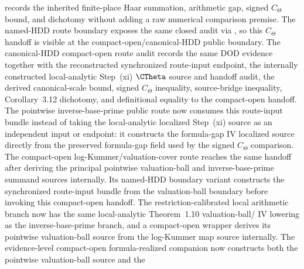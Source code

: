 \begin{proposition}
  records the inherited finite-place Haar summation, arithmetic gap,
  signed \(C_\Theta\) bound, and dichotomy without adding a raw numerical
  comparison premise.  The named-HDD route boundary exposes the same closed
  audit via
  ,
  so this \(C_\Theta\) handoff is visible at the compact-open/canonical-HDD
  public boundary.  The canonical-HDD compact-open route audit
  records the same DOD evidence together with the reconstructed synchronized
  route-input endpoint, the internally constructed local-analytic Step~(xi)
  \(\CTheta\) source and handoff audit, the derived canonical-scale bound,
  signed \(C_\Theta\) inequality, source-bridge inequality,
  Corollary~3.12 dichotomy, and definitional equality to the compact-open
  handoff.
  The pointwise inverse-base-prime
  public route now consumes this route-input bundle instead of taking the
  local-analytic localized Step~(xi) source as an independent input or endpoint:
  it constructs the formula-gap \IUT{} IV localized source directly from the
  preserved formula-gap field used by the signed \(C_\Theta\) comparison.  The
  compact-open log-Kummer/valuation-cover route reaches the
  same handoff after deriving the principal pointwise valuation-ball and
  inverse-base-prime summand sources internally.  Its named-HDD boundary
  variant constructs the synchronized route-input bundle from the
  valuation-ball boundary before invoking this compact-open handoff.
  The restriction-calibrated local
  arithmetic branch now has the same local-analytic Theorem~1.10
  valuation-ball/\IUT{} IV lowering as the inverse-base-prime branch, and a
  compact-open wrapper derives its pointwise valuation-ball source from the
  log-Kummer map source internally.
  The evidence-level compact-open formula-realized companion
  now constructs both the pointwise valuation-ball source and the

\end{proposition}
